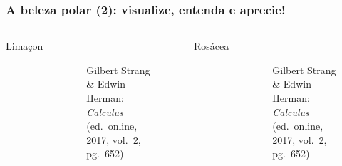 \documentclass[pdftex, brazil, aspectratio=169]{beamer}
\begin{document}
\begin{frame}[t]
  \frametitle{A beleza polar (2): visualize, entenda e aprecie!}
  \begin{columns}
    \centering
    Limaçon
    \begin{figure}[H]
      \begin{center}
        \label{fig:int2-20}
        \\
        \footnotesize{Gilbert Strang \& Edwin Herman: \emph{Calculus}
          (ed.\ online, 2017, vol.\ 2, pg.\ 652)}
      \end{center}
    \end{figure}
    \centering
    Rosácea
    \begin{figure}[H]
      \begin{center}
        \label{fig:int2-21}
        \\
        \footnotesize{Gilbert Strang \& Edwin Herman: \emph{Calculus}
          (ed.\ online, 2017, vol.\ 2, pg.\ 652)}
      \end{center}
    \end{figure}
  \end{columns}
\end{frame}
\end{document}
